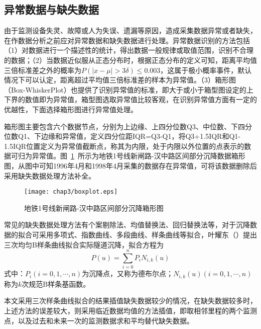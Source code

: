 \subsection{异常数据与缺失数据}

由于监测设备失灵、故障或人为失误、遗漏等原因，造成采集数据异常或者缺失，在作数据分析之前应对异常数据和缺失数据进行处理。异常数据识别的方法包括（1）对数据进行一个描述性的统计，得出数据一般规律或取值范围，识别不合理的数据；（2）当数据近似服从正态分布时，根据正态分布的定义可知，距离平均值三倍标准差之外的概率为$P(\left| x-\mu  \right|>3\delta )\le 0.003$，这属于极小概率事件，默认情况下可以认定，距离超过平均值三倍标准差的样本为异常值。（3）箱形图（Box-WhiskerPlot）也提供了识别异常值的标准，即大于或小于箱型图设定的上下界的数值即为异常值，箱型图选取异常值比较客观，在识别异常值方面有一定的优越性，下面选择箱形图进行异常值处理。

箱形图主要包含六个数据节点，分别为上边缘、上四分位数Q3、中位数、下四分位数Q1、下边缘和异常值，定义四分位距IQR=Q3-Q1，将Q3+1.5IQR和Q1-1.5IQR位置定义为异常值截断点，称其为内限，处于内限以外位置的点表示的数据可归为异常值。图~\ref{fig:地铁1号线新闸路-汉中路区间部分沉降箱形图}~所示为地铁1号线新闸路-汉中路区间部分沉降数据箱形图，从图中可知1996年4月和1998年4月采集的数据存在异常值，可将该数据删除后采用缺失数据处理方法补全。

\begin{figure}[htb!]
    \centering
    \texttt{[image: chap3/boxplot.eps]}
    \caption{地铁1号线新闸路-汉中路区间部分沉降箱形图}
    \label{fig:地铁1号线新闸路-汉中路区间部分沉降箱形图}
\end{figure}

常见的缺失数据处理方法有个案剔除法、均值替换法、回归替换法等，对于沉降数据的拟合可采用多项式、指数曲线、多段曲线、样条曲线等拟合，叶耀东（\citeyear{叶耀东2007软土地区运营地铁盾构隧道结构变形及健康诊断方法研究}）提出三次均匀B样条曲线拟合实际隧道沉降，拟合方程为
\begin{equation}
    P(u)=\sum\limits_{i=0}^{n}{{{P}_{i}}{{N}_{i,k}}(u)}
\end{equation}
式中：${{P}_{i}}(i=0,1,\cdots ,n)$为沉降点，又称为德布尔点；${{N}_{i,k}}(u)(i=0,1,\cdots ,n)$称为$k$次规范B样条基函数。

本文采用三次样条曲线拟合的结果插值缺失数据较少的情况，在缺失数据较多时，上述方法的误差较大，则采用临近数据均值的方法插值，即取相邻里程的两个监测点，以及过去和未来一次的监测数据求和平均替代缺失数据。



